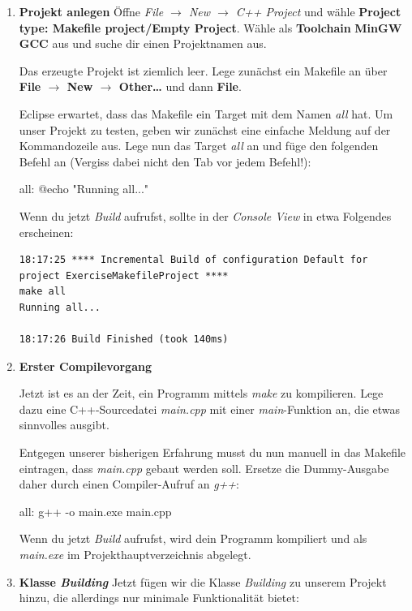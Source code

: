 \begin{enumerate}
\item\textbf{Projekt anlegen}
Öffne \emph{File $\to$ New $\to$ C++ Project} und wähle \textbf{Project type: Makefile project/Empty Project}.
Wähle als \textbf{Toolchain} \textbf{MinGW GCC} aus und suche dir einen Projektnamen aus.

Das erzeugte Projekt ist ziemlich leer.
Lege zunächst ein Makefile an über \textbf{File $\to$ New $\to$ Other\dots} und dann \textbf{File}.

Eclipse erwartet, dass das Makefile ein Target mit dem Namen \emph{all} hat.
Um unser Projekt zu testen, geben wir zunächst eine einfache Meldung auf der Kommandozeile aus.
Lege nun das Target \emph{all} an und füge den folgenden Befehl an (Vergiss dabei nicht den Tab vor jedem Befehl!):
\begin{lstmake}
all:
	@echo "Running all..."
\end{lstmake}

Wenn du jetzt \emph{Build} aufrufst, sollte in der \emph{Console View} in etwa Folgendes erscheinen:
\begin{verbatim}
18:17:25 **** Incremental Build of configuration Default for project ExerciseMakefileProject ****
make all
Running all...

18:17:26 Build Finished (took 140ms)
\end{verbatim}

\item\textbf{Erster Compilevorgang}

Jetzt ist es an der Zeit, ein Programm mittels \emph{make} zu kompilieren.
Lege dazu eine C++-Sourcedatei \emph{main.cpp} mit einer \emph{main}-Funktion an, die etwas sinnvolles ausgibt.

Entgegen unserer bisherigen Erfahrung musst du nun manuell in das Makefile eintragen, dass \emph{main.cpp} gebaut werden soll.
Ersetze die Dummy-Ausgabe daher durch einen Compiler-Aufruf an \emph{g++}:
\begin{lstmake}
all:
	g++ -o main.exe main.cpp
\end{lstmake}

Wenn du jetzt \emph{Build} aufrufst, wird dein Programm kompiliert und als \emph{main.exe} im Projekthauptverzeichnis abgelegt.

\item\textbf{Klasse \emph{Building}}
Jetzt fügen wir die Klasse \emph{Building} zu unserem Projekt hinzu, die allerdings nur minimale Funktionalität bietet:


\end{enumerate}
